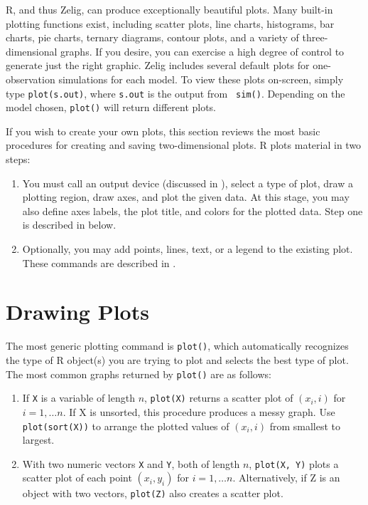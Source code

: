 \documentclass{article}
\begin{document}
\label{s:plot}

R, and thus Zelig, can produce exceptionally beautiful plots.  Many
built-in plotting functions exist, including scatter plots, line
charts, histograms, bar charts, pie charts, ternary diagrams, contour
plots, and a variety of three-dimensional graphs.  If you desire, you
can exercise a high degree of control to generate just the right
graphic.  Zelig includes several default plots for one-observation
simulations for each model.  To view these plots on-screen, simply
type {\tt plot(s.out)}, where {\tt s.out} is the output from {\tt
  sim()}.  Depending on the model chosen, {\tt plot()} will return
different plots.

If you wish to create your own plots, this section reviews the most
basic procedures for creating and saving two-dimensional plots.  R
plots material in two steps:  
\begin{enumerate}
\item You must call an output device (discussed in ),
  select a type of plot, draw a plotting region, draw axes, and plot
  the given data.  At this stage, you may also define axes labels, the
  plot title, and colors for the plotted data.  Step one is described
  in  below.
\item Optionally, you may add points, lines, text, or a legend to the
  existing plot.  These commands are described in .
\end{enumerate}

\section{Drawing Plots}\label{ss:draw}

The most generic plotting command is \texttt{plot()}, which
automatically recognizes the type of R object(s) you are trying to
plot and selects the best type of plot.  The most common graphs
returned by \texttt{plot()} are as follows:
\begin{enumerate}
\item If \texttt{X} is a variable of length $n$, \texttt{plot(X)}
  returns a scatter plot of $(x_i, i)$ for $i = 1, \dots n$.  If X is
  unsorted, this procedure produces a messy graph.  Use
  \texttt{plot(sort(X))} to arrange the plotted values of $(x_i, i)$
  from smallest to largest.
\item With two numeric vectors \texttt{X} and \texttt{Y}, both of
  length $n$, \texttt{plot(X, Y)} plots a scatter plot of each point
  $(x_i, y_i)$ for $i = 1, \dots n$.  Alternatively, if Z is an object
  with two vectors, \texttt{plot(Z)} also creates a scatter plot.
\end{enumerate}
\end{document}
